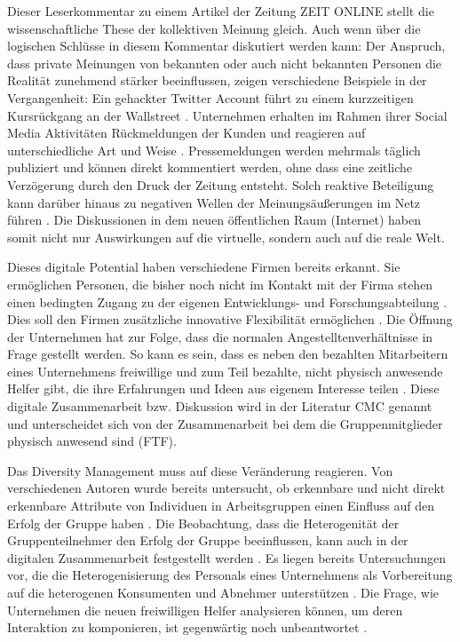 \documentclass[12pt,a4paper,oneside]{article}
\begin{document}
\begin{titlepage}
\begin{flushleft}
Dieser Leserkommentar zu einem Artikel der Zeitung ZEIT ONLINE stellt die wissenschaftliche These der kollektiven Meinung gleich. Auch wenn über die logischen Schlüsse in diesem Kommentar diskutiert werden kann: Der Anspruch, dass private Meinungen von bekannten oder auch nicht bekannten Personen die Realität zunehmend stärker beeinflussen, zeigen verschiedene Beispiele in der Vergangenheit: Ein gehackter Twitter Account führt zu einem kurzzeitigen Kursrückgang an der Wallstreet \cite{njacobsen}. Unternehmen erhalten im Rahmen ihrer Social Media Aktivitäten Rück\-mel\-dungen der Kunden und reagieren auf unterschiedliche Art und Weise \cite{rmueller}. Pressemeldungen werden mehrmals täglich publiziert und können direkt kommentiert werden, ohne dass eine zeitliche Verzögerung durch den Druck der Zeitung entsteht. Solch reaktive Beteiligung kann darüber hinaus zu negativen Wellen der Meinungsäußerungen im Netz führen \cite{hofmann2013krise}. Die Diskussionen in dem neuen öffentlichen Raum (Internet) haben somit nicht nur Auswirkungen auf die virtuelle, sondern auch auf die reale Welt.

Dieses digitale Potential haben verschiedene Firmen bereits erkannt. Sie ermöglichen Personen, die bisher noch nicht im Kontakt mit der Firma stehen einen bedingten Zugang zu der eigenen Entwicklungs- und Forschungsabteilung \cite{enkel2014applying}. Dies soll den Firmen zusätzliche innovative Flexibilität ermöglichen \cite{gassmann2006open}. Die Öffnung der Unternehmen hat zur Folge, dass die normalen Angestelltenverhältnisse in Frage gestellt werden. So kann es sein, dass es neben den bezahlten Mitarbeitern eines Unternehmens freiwillige und zum Teil bezahlte, nicht physisch anwesende Helfer gibt, die ihre Erfahrungen und Ideen aus eigenem Interesse teilen \cite{stachbert}. Diese digitale Zusammenarbeit bzw. Diskussion wird in der Literatur \ac{CMC} genannt und unterscheidet sich von der Zusammenarbeit bei dem die Gruppenmitglieder physisch anwesend sind (\ac{FTF}).

Das Diversity Management muss auf diese Veränderung reagieren. Von verschiedenen Autoren wurde bereits untersucht, ob erkennbare und nicht direkt erkennbare Attribute von Individuen in Arbeitsgruppen einen Einfluss auf den Erfolg der Gruppe haben \cite{ivancevich2000diversity,ely2001cultural,van2004work,beinrauch2012diversity,vashanti2012}. Die Beobachtung, dass die Heterogenität der Gruppenteilnehmer den Erfolg der Gruppe beeinflussen, kann auch in der digitalen Zusammenarbeit festgestellt werden \cite{bargh2002can}. Es liegen bereits Untersuchungen vor, die die Heterogenisierung des Personals eines Unternehmens als Vorbereitung auf die heterogenen Konsumenten und Abnehmer unterstützen \cite{vashanti2012}. Die Frage, wie Unternehmen die neuen freiwilligen Helfer analysieren können, um deren Interaktion zu komponieren, ist gegenwärtig noch unbeantwortet \cite{oiestad201454,Rothmann201466,Mangematin20141}.


\end{flushleft}
\end{titlepage}
\end{document}
